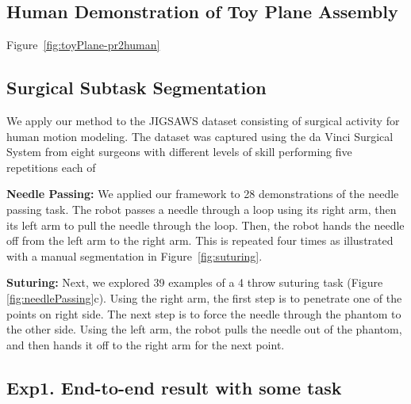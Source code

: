 \subsection{Human Demonstration of Toy Plane Assembly}
Figure~\ref{fig:toyPlane-pr2human}

\subsection{Surgical Subtask Segmentation}

We apply our method to the JIGSAWS dataset\cite{gao2014jigsaws} consisting of surgical activity for human motion modeling. The dataset was captured using the da Vinci Surgical System from eight surgeons with different levels of skill performing five repetitions each of 

\vspace{0.5em}

\noindent\textbf{Needle Passing: } We applied our framework to 28 demonstrations of the needle passing task.
The robot passes a needle through a loop using its right arm, then its left arm to pull the needle through the loop. Then, the robot hands the needle off from the left arm to the right arm. This is repeated four times as illustrated with a manual segmentation in Figure~\ref{fig:suturing}.

\vspace{0.5em}

\noindent\textbf{Suturing: }Next, we explored 39 examples of a 4 throw suturing task (Figure \ref{fig:needlePassing}c). Using the right arm, the first step is to penetrate one of the points on right side. The next step is to force the needle through the phantom to the other side. Using the left arm, the robot pulls the needle out of the phantom, and then hands it off to the right arm for the next point. 


\subsection{Exp1. End-to-end result with some task}

